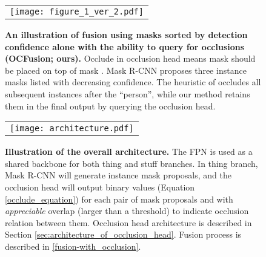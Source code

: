 \documentclass[10pt,twocolumn,letterpaper]{article}
\begin{document}
\begin{figure}[!ht]
\vspace{-1mm}
\begin{center}
\begin{tabular} {c}
\texttt{[image: figure\_1\_ver\_2.pdf]}
\end{tabular}
\end{center}
\vspace{-10mm}
\caption{\textbf{An illustration of fusion using masks sorted by detection confidence alone \cite{kirillov2018panoptic} \vs with the ability to query for occlusions (OCFusion; ours).} Occlude in occlusion head means mask  should be placed on top of mask . Mask R-CNN proposes three instance masks listed with decreasing confidence. The heuristic of \cite{kirillov2018panoptic} 
occludes all subsequent instances after the ``person'', while our method retains them in the final output by querying the occlusion head.}
\vspace{-5mm}
\label{fig:fusion_process}
\end{figure}

\begin{figure*}[!htp]
\vspace{-5mm} 
\begin{center}
\begin{tabular} {c}
\texttt{[image: architecture.pdf]}
\end{tabular}
\end{center}
\vspace{-5mm}
\caption{\textbf{Illustration of the overall architecture.} The FPN is used as a shared backbone for both thing and stuff branches. In thing branch, Mask R-CNN will generate instance mask proposals, and the occlusion head will output binary values  (Equation \ref{occlude_equation}) for each pair of mask proposals  and  with \textit{appreciable} overlap (larger than a threshold) to indicate occlusion relation between them. Occlusion head architecture is described in Section \ref{sec:architecture_of_occlusion_head}. Fusion process is described in \ref{fusion-with_occlusion}.}
\vspace{-4mm}
\label{fig:overall_architecture}
\end{figure*}
\end{document}
